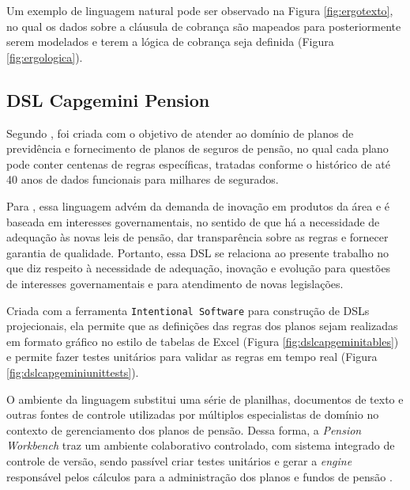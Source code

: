 \newpage
Um exemplo de linguagem natural pode ser observado na Figura \ref{fig:ergotexto}, no qual os dados sobre a cláusula de cobrança são mapeados para posteriormente serem modelados e terem a lógica de cobrança seja definida (Figura \ref{fig:ergologica}). 






\clearpage

\subsection{DSL Capgemini Pension}
\label{capgeminipension}

Segundo , foi criada com o objetivo de atender ao domínio de planos de previdência e fornecimento de planos de seguros de pensão, no qual cada plano pode conter centenas de regras específicas, tratadas conforme o histórico de até 40 anos de dados funcionais para milhares de segurados. 

 Para , essa linguagem advém da demanda de inovação em produtos da área e é baseada em interesses governamentais, no sentido de que há a necessidade de adequação às novas leis de pensão, dar transparência sobre as regras e fornecer garantia de qualidade. Portanto, essa DSL se relaciona ao presente trabalho no que diz respeito à necessidade de adequação, inovação e evolução para questões de interesses governamentais e para atendimento de novas legislações.

Criada com a ferramenta \texttt{Intentional Software} para construção de DSLs projecionais, ela permite que as definições das regras dos planos sejam realizadas em formato gráfico no estilo de tabelas de Excel (Figura \ref{fig:dslcapgeminitables}) e permite fazer testes unitários para validar as regras em tempo real (Figura \ref{fig:dslcapgeminiunittests}). 





O ambiente da linguagem substitui uma série de planilhas, documentos de texto e outras fontes de controle utilizadas por múltiplos especialistas de domínio no contexto de gerenciamento dos planos de pensão. Dessa forma, a \textit{Pension Workbench} traz um ambiente colaborativo controlado, com sistema integrado de controle de versão, sendo passível criar testes unitários e gerar a \textit{engine} responsável pelos cálculos para a administração dos planos e fundos de pensão \cite{gregfuller2013}.

